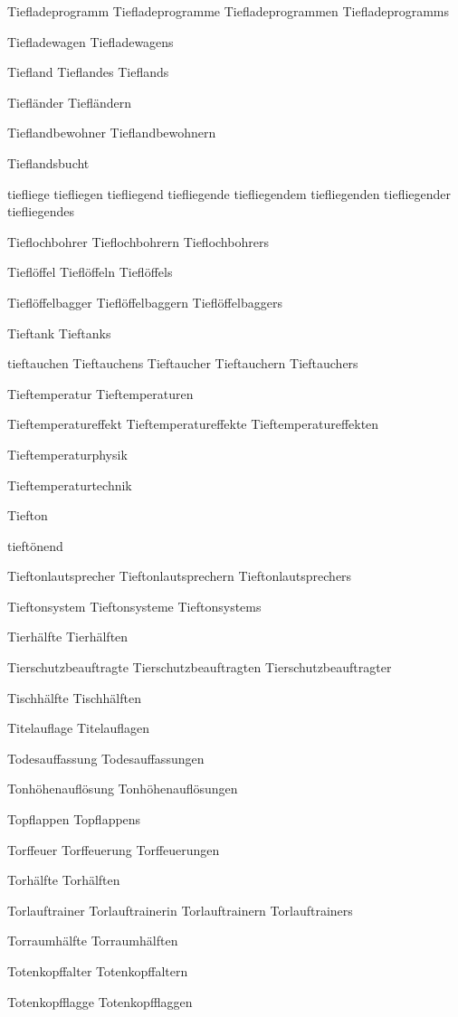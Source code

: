 Tiefladeprogramm
Tiefladeprogramme
Tiefladeprogrammen
Tiefladeprogramms

Tiefladewagen
Tiefladewagens

Tiefland
Tieflandes
Tieflands

Tiefländer
Tiefländern

Tieflandbewohner
Tieflandbewohnern

Tieflandsbucht

tiefliege 
tiefliegen 
tiefliegend
tiefliegende
tiefliegendem
tiefliegenden
tiefliegender
tiefliegendes

Tieflochbohrer
Tieflochbohrern
Tieflochbohrers

Tieflöffel
Tieflöffeln
Tieflöffels

Tieflöffelbagger
Tieflöffelbaggern
Tieflöffelbaggers

Tieftank
Tieftanks

tieftauchen
Tieftauchens
Tieftaucher
Tieftauchern
Tieftauchers

Tieftemperatur
Tieftemperaturen

Tieftemperatureffekt
Tieftemperatureffekte
Tieftemperatureffekten

Tieftemperaturphysik

Tieftemperaturtechnik

Tiefton

tieftönend

Tieftonlautsprecher
Tieftonlautsprechern
Tieftonlautsprechers

Tieftonsystem
Tieftonsysteme
Tieftonsystems

Tierhälfte
Tierhälften

Tierschutzbeauftragte
Tierschutzbeauftragten
Tierschutzbeauftragter

Tischhälfte
Tischhälften

Titelauflage
Titelauflagen

Todesauffassung
Todesauffassungen

Tonhöhenauflösung
Tonhöhenauflösungen

Topflappen
Topflappens

Torffeuer
Torffeuerung
Torffeuerungen

Torhälfte
Torhälften

Torlauftrainer
Torlauftrainerin
Torlauftrainern
Torlauftrainers

Torraumhälfte
Torraumhälften

Totenkopffalter
Totenkopffaltern

Totenkopfflagge
Totenkopfflaggen

